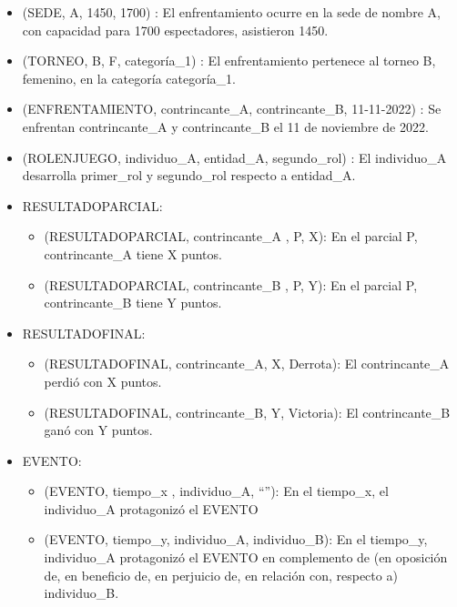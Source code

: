     \begin{itemize}
        \item (SEDE, A, 1450, 1700) : El enfrentamiento ocurre en la sede de nombre A, con capacidad para 1700 espectadores, asistieron 1450.
        \item (TORNEO, B, F, categoría\_1) : El enfrentamiento pertenece al torneo B, femenino, en la categoría categoría\_1.
        \item (ENFRENTAMIENTO, contrincante\_A, contrincante\_B, 11-11-2022) : Se enfrentan contrincante\_A y contrincante\_B el 11 de noviembre de 2022. 
        \item (ROLENJUEGO, individuo\_A, entidad\_A, segundo\_rol) : El individuo\_A desarrolla primer\_rol y segundo\_rol respecto a entidad\_A.
        \item RESULTADOPARCIAL:
            \begin{itemize}
                \item (RESULTADOPARCIAL, contrincante\_A , P, X): En el parcial P, contrincante\_A tiene X puntos.
                \item (RESULTADOPARCIAL, contrincante\_B , P, Y): En el parcial P, contrincante\_B tiene Y puntos.
            \end{itemize}
        \item RESULTADOFINAL:
            \begin{itemize}
                \item (RESULTADOFINAL, contrincante\_A, X, Derrota): El contrincante\_A perdió con X puntos.
                \item (RESULTADOFINAL, contrincante\_B, Y, Victoria): El contrincante\_B ganó con Y puntos.
            \end{itemize}
        \item EVENTO: 
            \begin{itemize}
                \item (EVENTO, tiempo\_x , individuo\_A, “”): En el tiempo\_x, el individuo\_A protagonizó el EVENTO
                \item (EVENTO, tiempo\_y, individuo\_A, individuo\_B): En el tiempo\_y, individuo\_A protagonizó el EVENTO en 
                complemento de (en oposición de, en beneficio de, en perjuicio de, en relación con, respecto a) individuo\_B. 
            \end{itemize}
    \end{itemize}

   


